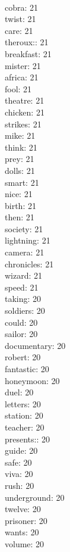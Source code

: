 \begin{multicols}{6}
  \\ cobra: 21
  \\ twist: 21
  \\ care: 21
  \\ theroux:: 21
  \\ breakfast: 21
  \\ mister: 21
  \\ africa: 21
  \\ fool: 21
  \\ theatre: 21
  \\ chicken: 21
  \\ strikes: 21
  \\ mike: 21
  \\ think: 21
  \\ prey: 21
  \\ dolls: 21
  \\ smart: 21
  \\ nice: 21
  \\ birth: 21
  \\ then: 21
  \\ society: 21
  \\ lightning: 21
  \\ camera: 21
  \\ chronicles: 21
  \\ wizard: 21
  \\ speed: 21
  \\ taking: 20
  \\ soldiers: 20
  \\ could: 20
  \\ sailor: 20
  \\ documentary: 20
  \\ robert: 20
  \\ fantastic: 20
  \\ honeymoon: 20
  \\ duel: 20
  \\ letters: 20
  \\ station: 20
  \\ teacher: 20
  \\ presents:: 20
  \\ guide: 20
  \\ safe: 20
  \\ viva: 20
  \\ rush: 20
  \\ underground: 20
  \\ twelve: 20
  \\ prisoner: 20
  \\ wants: 20
  \\ volume: 20

\end{multicols}
